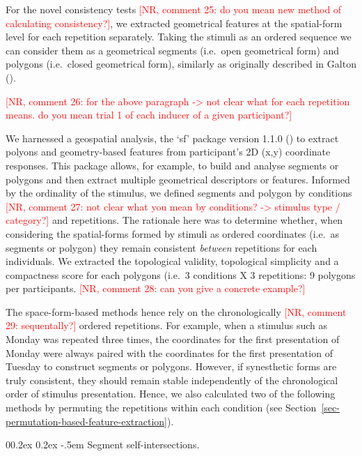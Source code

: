 \documentclass[
  man,
  longtable,
  a4paper,
  nolmodern,
  notxfonts,
  notimes,
  colorlinks=true,linkcolor=blue,citecolor=blue,urlcolor=blue]{apa7}
\makeatletter
\renewcommand{\paragraph}{\@startsection{paragraph}{4}{\parindent}%
	{0\baselineskip \@plus 0.2ex \@minus 0.2ex}%
	{-.5em}%
	{\normalfont\normalsize\bfseries\typesectitle}}
\makeatother
\begin{document}
For the novel consistency tests
\textcolor{red}{[NR, comment 25: do you mean new method of calculating consistency?]},
we extracted geometrical features at the spatial-form level for each
repetition separately. Taking the stimuli as an ordered sequence we can
consider them as a geometrical segments (i.e.~open geometrical form) and
polygons (i.e.~closed geometrical form), similarly as originally
described in Galton ().

\textcolor{red}{[NR, comment 26: for the above paragraph -> not clear what for each repetition means. do you mean trial 1 of each inducer of a given participant?]}

We harnessed a geospatial analysis, the `sf' package version 1.1.0
() to extract polyons and
geometry-based features from participant's 2D (x,y) coordinate
responses. This package allows, for example, to build and analyse
segments or polygons and then extract multiple geometrical descriptors
or features. Informed by the ordinality of the stimulus, we defined
segments and polygon by conditions
\textcolor{red}{[NR, comment 27: not clear what you mean by conditions? -> stimulus type / category?]}
and repetitions. The rationale here was to determine whether, when
considering the spatial-forms formed by stimuli as ordered coordinates
(i.e.~as segments or polygon) they remain consistent \emph{between}
repetitions for each individuals. We extracted the topological validity,
topological simplicity and a compactness score for each polygons (i.e.~3
conditions X 3 repetitions: 9 polygons per participants.
\textcolor{red}{[NR, comment 28: can you give a concrete example?]}

The space-form-based methods hence rely on the chronologically
\textcolor{red}{[NR, comment 29: sequentally?]} ordered repetitions. For
example, when a stimulus such as Monday was repeated three times, the
coordinates for the first presentation of Monday were always paired with
the coordinates for the first presentation of Tuesday to construct
segments or polygons. However, if synesthetic forms are truly
consistent, they should remain stable independently of the chronological
order of stimulus presentation. Hence, we also calculated two of the
following methods by permuting the repetitions within each condition
(see Section~\ref{sec-permutation-based-feature-extraction}).

\paragraph{Segment
self-intersections.}\label{segment-self-intersections}
\end{document}
